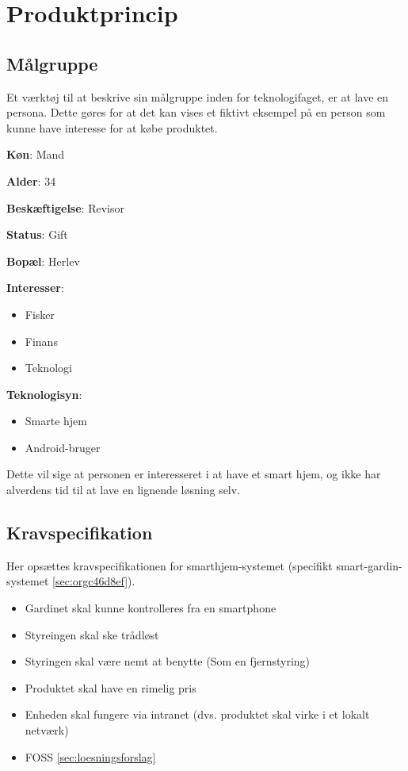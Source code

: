 \documentclass[11pt]{article}
\begin{document}
\newpage
\section{Produktprincip}
\label{sec:orga77d6f9}
\subsection{Målgruppe}
Et værktøj til at beskrive sin målgruppe inden for teknologifaget, er at lave en persona. Dette gøres for at det kan vises et fiktivt eksempel på en person som kunne have interesse for at købe produktet.

\textbf{Køn}: Mand

\textbf{Alder}: 34

\textbf{Beskæftigelse}: Revisor

\textbf{Status}: Gift

\textbf{Bopæl}: Herlev

\textbf{Interesser}: 
\begin{itemize}
\item Fisker
\item Finans
\item Teknologi
\end{itemize}

\textbf{Teknologisyn}: 
\begin{itemize}
\item Smarte hjem
\item Android-bruger
\end{itemize}

Dette vil sige at personen er interesseret i at have et smart hjem, og ikke har alverdens tid til at lave en lignende løsning selv.

\subsection{Kravspecifikation}
\label{sec:kravspecifikation}
Her opsættes kravspecifikationen for smarthjem-systemet (specifikt smart-gardin-systemet \ref{sec:orgc46d8ef}).
\begin{itemize}
\item Gardinet skal kunne kontrolleres fra en smartphone
\item Styreingen skal ske trådløst
\item Styringen skal være nemt at benytte (Som en fjernstyring)
\item Produktet skal have en rimelig pris
\item Enheden skal fungere via intranet (dvs. produktet skal virke i et lokalt netværk)
\item FOSS \ref{sec:loesningsforslag}
\end{itemize}
\end{document}
